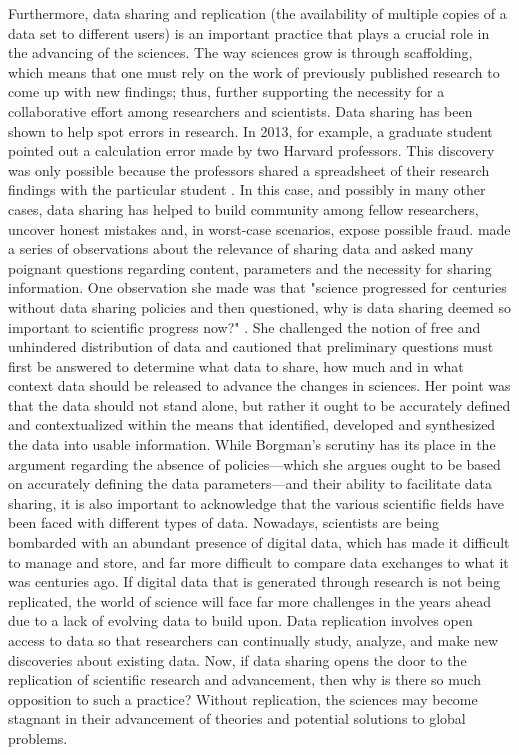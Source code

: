 \documentclass[sigconf]{acmart}
\begin{document}
Furthermore, data sharing and replication (the availability of multiple copies of a data set to different users) is an important practice that plays a crucial role in the advancing of the sciences. The way sciences grow is through scaffolding, which means that one must rely on the work of previously published research to come up with new findings; thus, further supporting the necessity for a collaborative effort among researchers and scientists. Data sharing has been shown to help spot errors in research. In 2013, for example, a graduate student pointed out a calculation error made by two Harvard professors. This discovery was only possible because the professors shared a spreadsheet of their research findings with the particular student \cite{leetaru2016}. In this case, and possibly in many other cases, data sharing has helped to build community among fellow researchers, uncover honest mistakes and, in worst-case scenarios, expose possible fraud. \cite{borgman2015if} made a series of observations about the relevance of sharing data and asked many poignant questions regarding content, parameters and the necessity for sharing information. One observation she made was that "science progressed for centuries without data sharing policies and then questioned, why is data sharing deemed so important to scientific progress now?" \cite{borgman2015if}. She challenged the notion of free and unhindered distribution of data and cautioned that preliminary questions must first be answered to determine what data to share, how much and in what context data should be released to advance the changes in sciences. Her point was that the data should not stand alone, but rather it ought to be accurately defined and contextualized within the means that identified, developed and synthesized the data into usable information. While Borgman's scrutiny has its place in the argument regarding the absence of policies—which she argues ought to be based on accurately defining the data parameters—and their ability to facilitate data sharing, it is also important to acknowledge that the various scientific fields have been faced with different types of data. 
Nowadays, scientists are being bombarded with an abundant presence of digital data, which has made it difficult to manage and store, and far more difficult to compare data exchanges to what it was centuries ago. If digital data that is generated through research is not being replicated, the world of science will face far more challenges in the years ahead due to a lack of evolving data to build upon. Data replication involves open access to data so that researchers can continually study, analyze, and make new discoveries about existing data. Now, if data sharing opens the door to the replication of scientific research and advancement, then why is there so much opposition to such a practice? Without replication, the sciences may become stagnant in their advancement of theories and potential solutions to global problems.
\end{document}
